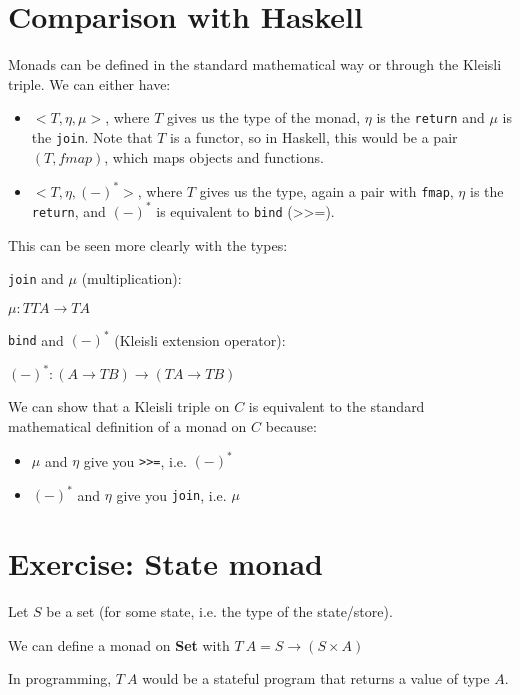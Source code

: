 \documentclass[../main.tex]{subfiles}
\begin{document}
\section{Comparison with Haskell}

Monads can be defined in the standard mathematical way or through the Kleisli triple. We can either have:
\begin{itemize}
\item $<T,\eta,\mu>$, where $T$ gives us the type of the monad, $\eta$ is the {\tt return} and $\mu$ is the {\tt join}. Note that $T$ is a functor, so in Haskell, this would be a pair $(T,fmap)$, which maps objects and functions.
\item $<T,\eta,(-)^*>$, where $T$ gives us the type, again a pair with {\tt fmap}, $\eta$ is the {\tt return}, and $(-)^*$ is equivalent to {\tt bind} (>>=).
\end{itemize}

This can be seen more clearly with the types:

{\tt join} and $\mu$ (multiplication):


\qquad $\mu : T T A \rightarrow T A$

{\tt bind} and $(-)^*$ (Kleisli extension operator):


\qquad $(-)^* : (A \rightarrow T B) \rightarrow (T A \rightarrow T B)$

We can show that a Kleisli triple on $C$ is equivalent to the standard mathematical definition of a monad on $C$ because:
\begin{itemize}
\item $\mu$ and $\eta$ give you {\tt >>=}, i.e. $(-)^*$
\item $(-)^*$ and $\eta$ give you {\tt join}, i.e. $\mu$
\end{itemize}

\section{Exercise: State monad}

Let $S$ be a set (for some state, i.e. the type of the state/store).

We can define a monad on \textbf{Set} with $T~A = S \rightarrow (S \times A)$

In programming, $T~A$ would be a stateful program that returns a value of type $A$.
\end{document}
